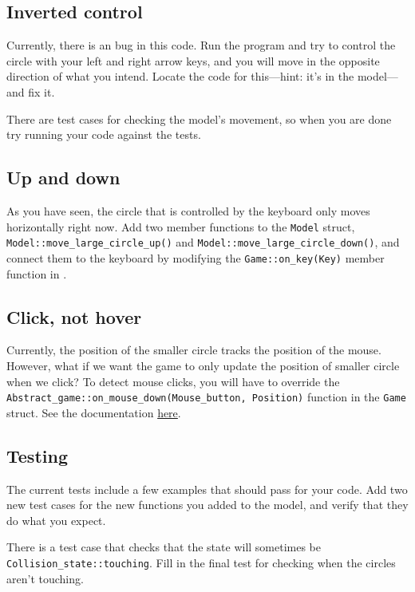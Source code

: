 \documentclass{tufte-handout}
\begin{document}
\subsection{Inverted control}

Currently, there is an bug in this code. Run the program and try to
control the circle with your left and right arrow keys, and you will
move in the opposite direction of what you intend. Locate the code for
this---hint: it's in the model---and fix it.

There are test cases for checking the model's movement, so when you are
done try running your code against the tests.

\subsection{Up and down}

As you have seen, the circle that is controlled by the keyboard only
moves horizontally right now.
Add two member functions to the \verb!Model! struct,
\verb!Model::move_large_circle_up()! and
\verb!Model::move_large_circle_down()!, and connect them to the keyboard
by modifying the \verb!Game::on_key(Key)! member function in
.

\subsection{Click, not hover}

Currently, the position of the smaller circle tracks the position of the
mouse. However, what if we want the game to only update the position of
smaller circle when we click? To detect mouse clicks, you will have to
override the \verb!Abstract_game::on_mouse_down(Mouse_button, Position)!
function in the \verb!Game! struct. See the documentation
\href{https://tov.github.io/ge211/classge211_1_1_abstract__game.html\#a6d88b5777c0a08fe261bc39c0694dd4f}{here}.

\subsection{Testing}

The current tests include a few examples that should pass
for your code. Add two new test cases for the new functions you added to
the model, and verify that they do what you expect.

There is a test case that checks that the state will sometimes be
\verb!Collision_state::touching!. Fill in the final test for checking
when the circles aren't touching.
\end{document}
